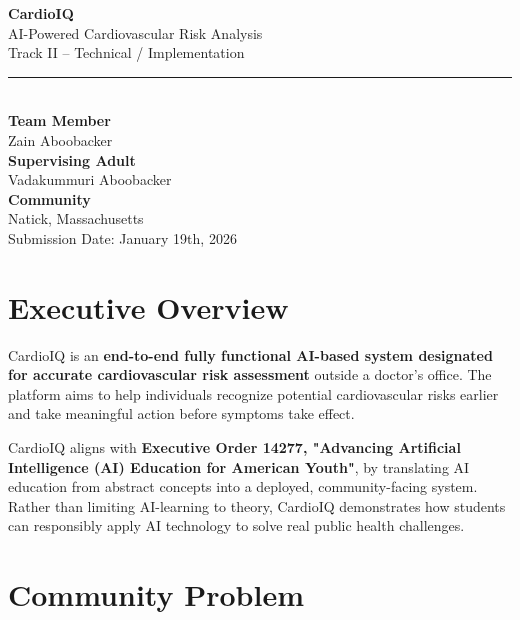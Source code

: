 \documentclass[12pt]{article}
\begin{document}
\begin{titlepage}
    \centering
    \vspace*{1.8in}

    {\Huge \textbf{CardioIQ}}\\[0.3cm]
    {\Large AI-Powered Cardiovascular Risk Analysis}\\[0.8cm]

    {\large Track II -- Technical / Implementation}\\[1.5cm]

    \rule{0.85\linewidth}{0.8pt}\\[1cm]

    \textbf{Team Member}\\[0.3cm]
    Zain Aboobacker\\[0.8cm]

    \textbf{Supervising Adult}\\[0.3cm]
    Vadakummuri Aboobacker\\[0.8cm]

    \textbf{Community}\\[0.3cm]
    Natick, Massachusetts\\[1.2cm]

    Submission Date: January 19th, 2026

    \vfill
\end{titlepage}

\section*{Executive Overview}
CardioIQ is an \textbf{end-to-end fully functional AI-based system designated for accurate cardiovascular risk assessment} outside a doctor’s office. The platform aims to help individuals recognize potential cardiovascular risks earlier and take meaningful action before symptoms take effect.

CardioIQ aligns with \textbf{Executive Order 14277, "Advancing Artificial Intelligence (AI) Education for American Youth"}, by translating AI education from abstract concepts into a deployed, community-facing system\cite{eo14277}. Rather than limiting AI-learning to theory, CardioIQ demonstrates how students can responsibly apply AI technology to solve real public health challenges. 

\section*{Community Problem}
\end{document}
